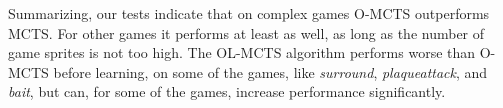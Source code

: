 Summarizing, our tests indicate that on complex games O-MCTS outperforms MCTS.
For other games it performs at least as well, as long as the number of game
sprites is not too high. 
The OL-MCTS algorithm performs worse than O-MCTS before learning, on some of the
games, like \textit{surround}, \textit{plaqueattack}, and \textit{bait}, but
can, for some of the games, increase performance significantly.
